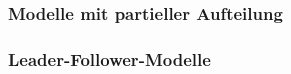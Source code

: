 
        \subsubsection{Modelle mit partieller Aufteilung} %
        \label{ssub:modelle_mit_partieller_aufteilung}
        

        \subsubsection{Leader-Follower-Modelle} %
        \label{ssub:leader_follower_modelle}
        
      
    
